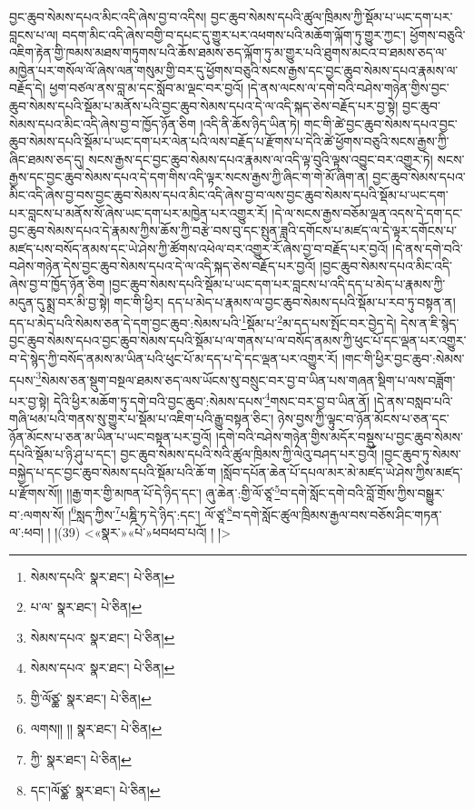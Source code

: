 བྱང་ཆུབ་སེམས་དཔའ་མིང་འདི་ཞེས་བྱ་བ་འདིས། བྱང་ཆུབ་སེམས་དཔའི་ཚུལ་ཁྲིམས་ཀྱི་སྡོམ་པ་ཡང་དག་པར་བླངས་པ་ལ། བདག་མིང་འདི་ཞེས་བགྱི་བ་དཔང་དུ་གྱུར་པར་འཕགས་པའི་མཆོག་ལྐོག་ཏུ་གྱུར་ཀྱང་། ཕྱོགས་བཅུའི་འཇིག་རྟེན་གྱི་ཁམས་མཐས་གཏུགས་པའི་ཆོས་ཐམས་ཅད་ལྐོག་ཏུ་མ་གྱུར་པའི་ཐུགས་མངའ་བ་ཐམས་ཅད་ལ་མཁྱེན་པར་གསོལ་ལོ་ཞེས་ལན་གསུམ་གྱི་བར་དུ་ཕྱོགས་བཅུའི་སངས་རྒྱས་དང་བྱང་ཆུབ་སེམས་དཔའ་རྣམས་ལ་བརྗོད་དེ། ཕྱག་བཙལ་ནས་བླ་མ་དང་སློབ་མ་ལྡང་བར་བྱའོ། །དེ་ནས་ལངས་ལ་དགེ་བའི་བཤེས་གཉེན་གྱིས་བྱང་ཆུབ་སེམས་དཔའི་སྡོམ་པ་མནོས་པའི་བྱང་ཆུབ་སེམས་དཔའ་དེ་ལ་འདི་སྐད་ཅེས་བརྗོད་པར་བྱ་སྟེ། བྱང་ཆུབ་སེམས་དཔའ་མིང་འདི་ཞེས་བྱ་བ་ཁྱོད་ཉོན་ཅིག །འདི་ནི་ཆོས་ཉིད་ཡིན་ཏེ། གང་གི་ཚེ་བྱང་ཆུབ་སེམས་དཔའ་བྱང་ཆུབ་སེམས་དཔའི་སྡོམ་པ་ཡང་དག་པར་ལེན་པའི་ལས་བརྗོད་པ་རྫོགས་པ་དེའི་ཚེ་ཕྱོགས་བཅུའི་སངས་རྒྱས་ཀྱི་ཞིང་ཐམས་ཅད་དུ། སངས་རྒྱས་དང་བྱང་ཆུབ་སེམས་དཔའ་རྣམས་ལ་འདི་ལྟ་བུའི་ལྟས་འབྱུང་བར་འགྱུར་ཏེ། སངས་རྒྱས་དང་བྱང་ཆུབ་སེམས་དཔའ་དེ་དག་གིས་འདི་ལྟར་སངས་རྒྱས་ཀྱི་ཞིང་ག་གེ་མོ་ཞིག་ན། བྱང་ཆུབ་སེམས་དཔའ་མིང་འདི་ཞེས་བྱ་བས་བྱང་ཆུབ་སེམས་དཔའ་མིང་འདི་ཞེས་བྱ་བ་ལས་བྱང་ཆུབ་སེམས་དཔའི་སྡོམ་པ་ཡང་དག་པར་བླངས་པ་མནོས་སོ་ཞེས་ཡང་དག་པར་མཁྱེན་པར་འགྱུར་རོ། །དེ་ལ་སངས་རྒྱས་བཅོམ་ལྡན་འདས་དེ་དག་དང་བྱང་ཆུབ་སེམས་དཔའ་དེ་རྣམས་ཀྱིས་ཆོས་ཀྱི་བརྩེ་བས་བུ་དང་སྤུན་ཟླའི་དགོངས་པ་མཛད་ལ་དེ་ལྟར་དགོངས་པ་མཛད་པས་བསོད་ནམས་དང་ཡེ་ཤེས་ཀྱི་ཚོགས་འཕེལ་བར་འགྱུར་རོ་ཞེས་བྱ་བ་བརྗོད་པར་བྱའོ། །དེ་ནས་དགེ་བའི་བཤེས་གཉེན་དེས་བྱང་ཆུབ་སེམས་དཔའ་དེ་ལ་འདི་སྐད་ཅེས་བརྗོད་པར་བྱའོ། །བྱང་ཆུབ་སེམས་དཔའ་མིང་འདི་ཞེས་བྱ་བ་ཁྱོད་ཉོན་ཅིག །བྱང་ཆུབ་སེམས་དཔའི་སྡོམ་པ་ཡང་དག་པར་བླངས་པ་འདི་དད་པ་མེད་པ་རྣམས་ཀྱི་མདུན་དུ་སྨྲ་བར་མི་བྱ་སྟེ། གང་གི་ཕྱིར། དད་པ་མེད་པ་རྣམས་ལ་བྱང་ཆུབ་སེམས་དཔའི་སྡོམ་པ་རབ་ཏུ་བསྟན་ན། དད་པ་མེད་པའི་སེམས་ཅན་དེ་དག་བྱང་ཆུབ་:སེམས་པའི་\footnote{སེམས་དཔའི་  སྣར་ཐང་།  པེ་ཅིན། }སྡོམ་པ་\footnote{པ་ལ་  སྣར་ཐང་།  པེ་ཅིན། }མ་དད་པས་སྤོང་བར་བྱེད་དེ། དེས་ན་ཇི་སྙེད་བྱང་ཆུབ་སེམས་དཔའ་བྱང་ཆུབ་སེམས་དཔའི་སྡོམ་པ་ལ་གནས་པ་ལ་བསོད་ནམས་ཀྱི་ཕུང་པོ་དང་ལྡན་པར་འགྱུར་བ་དེ་སྙེད་ཀྱི་བསོད་ནམས་མ་ཡིན་པའི་ཕུང་པོ་མ་དད་པ་དེ་དང་ལྡན་པར་འགྱུར་རོ། །གང་གི་ཕྱིར་བྱང་ཆུབ་:སེམས་དཔས་\footnote{སེམས་དཔའ་  སྣར་ཐང་།  པེ་ཅིན། }སེམས་ཅན་སྡུག་བསྔལ་ཐམས་ཅད་ལས་ཡོངས་སུ་བསྲུང་བར་བྱ་བ་ཡིན་པས་གཞན་སྡིག་པ་ལས་བཟློག་པར་བྱ་སྟེ། དེའི་ཕྱིར་མཆོག་ཏུ་དགེ་བའི་བྱང་ཆུབ་:སེམས་དཔས་\footnote{སེམས་དཔའ་  སྣར་ཐང་།  པེ་ཅིན། }གསང་བར་བྱ་བ་ཡིན་ནོ། །དེ་ནས་བསླབ་པའི་གཞི་ཕམ་པའི་གནས་སུ་གྱུར་པ་སྡོམ་པ་འཇིག་པའི་རྒྱུ་བསྟན་ཅིང་། ཉེས་བྱས་ཀྱི་ལྟུང་བ་ཉོན་མོངས་པ་ཅན་དང་ཉོན་མོངས་པ་ཅན་མ་ཡིན་པ་ཡང་བསྟན་པར་བྱའོ། །དགེ་བའི་བཤེས་གཉེན་གྱིས་མདོར་བསྡུས་པ་བྱང་ཆུབ་སེམས་དཔའི་སྡོམ་པ་ཉི་ཤུ་པ་དང་། བྱང་ཆུབ་སེམས་དཔའི་སའི་ཚུལ་ཁྲིམས་ཀྱི་ལེའུ་བཤད་པར་བྱའོ། །བྱང་ཆུབ་ཏུ་སེམས་བསྐྱེད་པ་དང་བྱང་ཆུབ་སེམས་དཔའི་སྡོམ་པའི་ཆོ་ག །སློབ་དཔོན་ཆེན་པོ་དཔལ་མར་མེ་མཛད་ཡེ་ཤེས་ཀྱིས་མཛད་པ་རྫོགས་སོ།། །།རྒྱ་གར་གྱི་མཁན་པོ་དེ་ཉིད་དང་། ཞུ་ཆེན་:གྱི་ལོ་ཙཱ་\footnote{གྱི་ལོཙྪ་  སྣར་ཐང་།  པེ་ཅིན། }བ་དགེ་སློང་དགེ་བའི་བློ་གྲོས་ཀྱིས་བསྒྱུར་བ་:ལགས་སོ། །\footnote{ལགས།། །།  སྣར་ཐང་།  པེ་ཅིན། }སླད་ཀྱིས་\footnote{ཀྱི་  སྣར་ཐང་།  པེ་ཅིན། }པཎྜི་ཏ་དེ་ཉིད་:དང་། ལོ་ཙཱ་\footnote{དང་།ལོཙྪ་  སྣར་ཐང་།  པེ་ཅིན། }བ་དགེ་སློང་ཚུལ་ཁྲིམས་རྒྱལ་བས་བཅོས་ཤིང་གཏན་ལ་:ཕབ། ། །(39) <«སྣར་»«པེ་»ཕབཕབ་པའོ། །
 །>